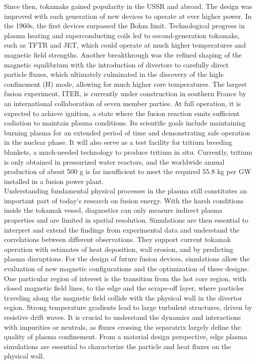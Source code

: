Since then, tokamaks gained popularity in the USSR and abroad. The design was improved with each generation of new devices to operate at ever higher power. In the 1960s, the first devices surpassed the Bohm limit. Technological progress in plasma heating and superconducting coils led to second-generation tokamaks, such as TFTR and JET, which could operate at much higher temperatures and magnetic field strengths. Another breakthrough was the refined shaping of the magnetic equilibrium with the introduction of divertors to carefully direct particle fluxes, which ultimately culminated in the discovery of the high-confinement (H) mode, allowing for much higher core temperatures. The largest fusion experiment, ITER, is currently under construction in southern France by an international collaboration of seven member parties. At full operation, it is expected to achieve ignition, a state where the fusion reaction emits sufficient radiation to maintain plasma conditions. Its scientific goals include maintaining burning plasma for an extended period of time and demonstrating safe operation in the nuclear phase. It will also serve as a test facility for tritium breeding blankets, a much-needed technology to produce tritium in situ. Currently, tritium is only obtained in pressurized water reactors, and the worldwide annual production of about 500 g is far insufficient to meet the required 55.8 kg per GW installed in a fusion power plant\cite{abdou2020physics}. \\

Understanding fundamental physical processes in the plasma still constitutes an important part of today's research on fusion energy. With the harsh conditions inside the tokamak vessel, diagnostics can only measure indirect plasma properties and are limited in spatial resolution. Simulations are then essential to interpret and extend the findings from experimental data and understand the correlations between different observations. They support current tokamak operation with estimates of heat deposition, wall erosion, and by predicting plasma disruptions. For the design of future fusion devices, simulations allow the evaluation of new magnetic configurations and the optimization of these designs. One particular region of interest is the transition from the hot core region, with closed magnetic field lines, to the edge and the scrape-off layer, where particles traveling along the magnetic field collide with the physical wall in the divertor region. Strong temperature gradients lead to large turbulent structures, driven by resistive drift waves. It is crucial to understand the dynamics and interactions with impurities or neutrals, as fluxes crossing the separatrix largely define the quality of plasma confinement. From a material design perspective, edge plasma simulations are essential to characterize the particle and heat fluxes on the physical wall. \\

